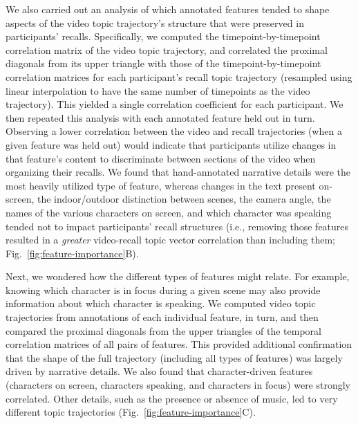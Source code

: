 \documentclass{article}
\begin{document}
We also carried out an analysis of which annotated features tended to shape aspects of the video topic trajectory's structure that were preserved in participants' recalls.  Specifically, we computed the timepoint-by-timepoint correlation matrix of the video topic trajectory, and correlated the proximal diagonals from its upper triangle with those of the timepoint-by-timepoint correlation matrices for each participant's recall topic trajectory (resampled using linear interpolation to have the same number of timepoints as the video trajectory).  This yielded a single correlation coefficient for each participant.  We then repeated this analysis with each annotated feature held out in turn.  Observing a lower correlation between the video and recall trajectories (when a given feature was held out) would indicate that participants utilize changes in that feature's content to discriminate between sections of the video when organizing their recalls.  We found that hand-annotated narrative details were the most heavily utilized type of feature, whereas changes in the text present on-screen, the indoor/outdoor distinction between scenes, the camera angle, the names of the various characters on screen, and which character was speaking tended not to impact participants' recall structures (i.e., removing those features resulted in a \textit{greater} video-recall topic vector correlation than including them; Fig.~\ref{fig:feature-importance}B).

Next, we wondered how the different types of features might relate.  For example, knowing which character is in focus during a given scene may also provide information about which character is speaking.  We computed video topic trajectories from annotations of each individual feature, in turn, and then compared the proximal diagonals from the upper triangles of the temporal correlation matrices of all pairs of features.  This provided additional confirmation that the shape of the full trajectory (including all types of features) was largely driven by narrative details.  We also found that character-driven features (characters on screen, characters speaking, and characters in focus) were strongly correlated.  Other details, such as the presence or absence of music, led to very different topic trajectories (Fig.~\ref{fig:feature-importance}C).
\end{document}
